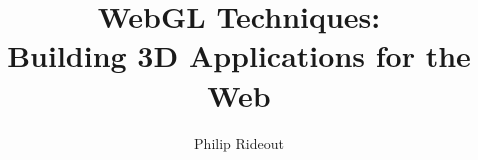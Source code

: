 \documentclass{book}
\title{WebGL Techniques:\\Building 3D Applications for the Web}
\date{}
\author{Philip Rideout}
\begin{document}
\mainmatter
 \renewcommand{\chaptermark}[1]{\markboth{Chapter \thechapter. #1}{}}
 \renewcommand{\sectionmark}[1]{\markright{\thesection. #1}}




\def\thesection {Recipe \arabic{section}:}
\def\thesubsection {\arabic{section}.\arabic{subsection}}
\renewcommand{\sectionmark}[1]{\markright{\thesection\ #1}}


\makeatletter
\renewcommand\section{\@startsection {section}{1}{\z@}%
                                   {0pt}%
                                   {0pt}%
                                   {\vphantom}}
\makeatother

\newcommand{\definerecipe}[4]
{
	\vspace{0.1in}
	\marginpar { \raggedright \tiny
		\vspace{0.3in}
		#2
	}
	\section{#1} \ \\
	\addcontentsline{toc}{section}{#1}
	\mbox{ \colorbox{bg}{\begin{minipage}{4in}
	\vspace{0.05in}
	\raggedright \Large \textbf{\thesection\ #1} \normalsize
	\vspace{0.05in}
	\setlength\fboxsep{0pt}
	\begin{tabular}{ l p{2.15in} }
	 \vtop{\vspace{0pt}\hbox{\fbox{\texttt{[image: ../media/screenshots/\#3]}} }} &
	 \vtop{\vspace{0pt}\parbox{2.15in}{\noindent\small\textsf{#4} } }\\
	\end{tabular}
	\vspace{0.05in}
	\end{minipage} } }
	\vspace{0.2in}
}

%
%
%
%
%
%

\backmatter
 \renewcommand{\chaptermark}[1]{\markboth{#1}{#1}}

\raggedright

%
%
\end{document}
